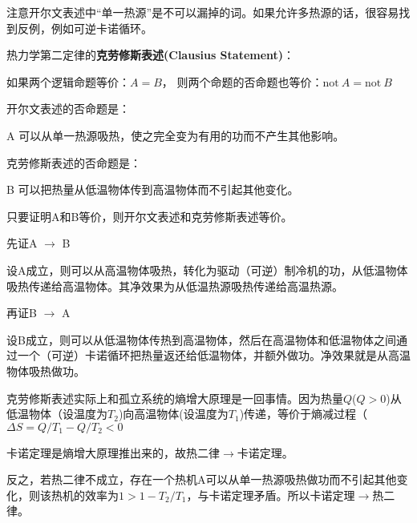 \documentclass[CJK]{beamer}
\begin{document}
\begin{frame}
\bch
注意开尔文表述中“单一热源”是不可以漏掉的词。如果允许多热源的话，很容易找到反例，例如可逆卡诺循环。
\ech
\end{frame}

\begin{frame}
\bch
热力学第二定律的{\bf 克劳修斯表述(Clausius Statement)}：
\ech
\end{frame}

\begin{frame}
\bch
如果两个逻辑命题等价：$A=B$， 则两个命题的否命题也等价：$\mathrm{not}\ A = \mathrm{not}\ B$
\ech
\end{frame}

\begin{frame}
\bch
{\small
\bitem
\item{
开尔文表述的否命题是：

A 可以从单一热源吸热，使之完全变为有用的功而不产生其他影响。
}
\item{
克劳修斯表述的否命题是：

B 可以把热量从低温物体传到高温物体而不引起其他变化。
}
\eitem

只要证明A和B等价，则开尔文表述和克劳修斯表述等价。

先证A $\rightarrow$ B

设A成立，则可以从高温物体吸热，转化为驱动（可逆）制冷机的功，从低温物体吸热传递给高温物体。其净效果为从低温热源吸热传递给高温热源。

\skipline

再证B $\rightarrow$ A

设B成立，则可以从低温物体传热到高温物体，然后在高温物体和低温物体之间通过一个（可逆）卡诺循环把热量返还给低温物体，并额外做功。净效果就是从高温物体吸热做功。
}
\ech
\end{frame}

\begin{frame}
\bch
克劳修斯表述实际上和孤立系统的熵增大原理是一回事情。因为热量$Q$($Q>0$)从低温物体（设温度为$T_2$)向高温物体(设温度为$T_1$)传递，等价于熵减过程（$\Delta S = Q/T_1 - Q/T_2<0$
\ech
\end{frame}

\begin{frame}
\bch
卡诺定理是熵增大原理推出来的，故热二律$\rightarrow$卡诺定理。

反之，若热二律不成立，存在一个热机A可以从单一热源吸热做功而不引起其他变化，则该热机的效率为$1>1-T_2/T_1$，与卡诺定理矛盾。所以卡诺定理$\rightarrow$热二律。

\ech
\end{frame}
\end{document}
